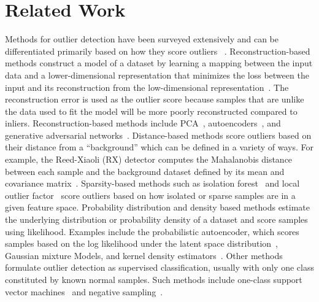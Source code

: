 \documentclass[letterpaper]{article} %
\begin{document}
\section{Related Work}
Methods for outlier detection have been 
surveyed extensively and can be differentiated primarily based on how they 
score outliers
~\cite{pimentel2014review,chandola2009anomaly,markou2003novelty,
markou2003novelty2}.
%
Reconstruction-based methods construct a model of a dataset by learning 
a mapping between the input data and a lower-dimensional representation that
 minimizes the loss between the input and its reconstruction from the 
 low-dimensional representation~\citep{kerner2020comparison}. The 
 reconstruction error is used as the outlier score because samples
  that are unlike the data used to fit the model will be more poorly 
  reconstructed compared to inliers. Reconstruction-based methods
  include PCA~\cite{jablonski2015principal}, 
  autoencoders~\cite{richter2017safe}, and
  generative adversarial networks~\cite{akcay2018ganomaly}.
%
 Distance-based methods score outliers based on their distance from a
``background'' which can be defined in a variety of ways. For example,
the Reed-Xiaoli (RX) detector computes the 
Mahalanobis distance between each sample and the background dataset
defined by its mean and covariance matrix~\cite{reed1990adaptive}.
%
Sparsity-based methods such as isolation forest~\cite{liu2008isolation}
and local outlier factor~\cite{breunig2000lof}
 score outliers based on how isolated or sparse samples 
are in a given feature space. 
%
Probability distribution and density based methods estimate the underlying 
distribution or probability density of a dataset and score samples using
 likelihood. Examples include the probabilistic
autoencoder, which scores samples based on the log likelihood under the 
latent space distribution~\cite{bohm2020probabilistic}, Gaussian mixture 
Models, and kernel density estimators~\cite{chandola2009anomaly}. 
%
Other methods formulate outlier detection as supervised classification, 
usually with only one class constituted by 
known normal samples.
Such methods include one-class support vector 
machines~\cite{scholkopf1999support}
and negative sampling~\cite{sipple:neg-sampling20}.
\end{document}

